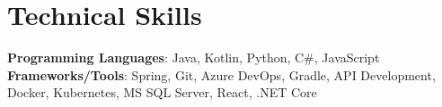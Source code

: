\section{Technical Skills}
 \begin{itemize}[leftmargin=0.15in, label={}]
    \small{\item{
      \textbf{Programming Languages}{: Java, Kotlin, Python, C\#, JavaScript} \\
     \textbf{Frameworks/Tools}{: Spring, Git, Azure DevOps, Gradle, API Development, Docker, Kubernetes, MS SQL Server, React, .NET Core }\\
    }}
 \end{itemize}